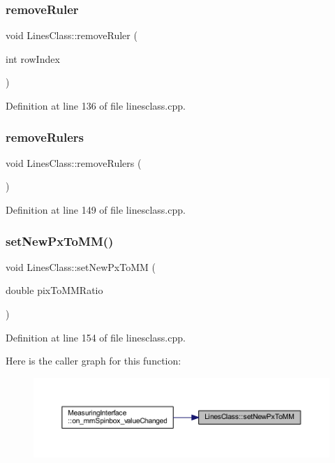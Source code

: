 \subsubsection{\texorpdfstring{removeRuler}{removeRuler}}
{\footnotesize\ttfamily void Lines\+Class\+::remove\+Ruler (\begin{DoxyParamCaption}\item[{int}]{row\+Index }\end{DoxyParamCaption})\hspace{0.3cm}{\ttfamily [slot]}}



Definition at line 136 of file linesclass.\+cpp.

\mbox{\label{class_lines_class_a6214ae9c3e61143c6ee013e55d346281}} 
\subsubsection{\texorpdfstring{removeRulers}{removeRulers}}
{\footnotesize\ttfamily void Lines\+Class\+::remove\+Rulers (\begin{DoxyParamCaption}{ }\end{DoxyParamCaption})\hspace{0.3cm}{\ttfamily [slot]}}



Definition at line 149 of file linesclass.\+cpp.

\mbox{\label{class_lines_class_a27046d1871f85101660c20703d87b1db}} 
\subsubsection{\texorpdfstring{setNewPxToMM()}{setNewPxToMM()}}
{\footnotesize\ttfamily void Lines\+Class\+::set\+New\+Px\+To\+MM (\begin{DoxyParamCaption}\item[{double}]{pix\+To\+M\+M\+Ratio }\end{DoxyParamCaption})}



Definition at line 154 of file linesclass.\+cpp.

Here is the caller graph for this function\+:
\nopagebreak
\begin{figure}[H]
\begin{center}
\leavevmode
\includegraphics[width=350pt]{class_lines_class_a27046d1871f85101660c20703d87b1db_icgraph}
\end{center}
\end{figure}


